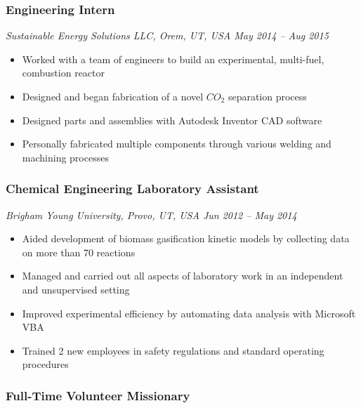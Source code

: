 \hypertarget{engineering-intern}{%
\subsubsection{Engineering Intern}\label{engineering-intern}}

\emph{Sustainable Energy Solutions LLC, Orem, UT, USA \textbar{} May
2014 -- Aug 2015}

\begin{itemize}
\tightlist
\item
  Worked with a team of engineers to build an experimental, multi-fuel,
  combustion reactor
\item
  Designed and began fabrication of a novel \(CO_2\)\hspace{0pt}
  separation process
\item
  Designed parts and assemblies with Autodesk Inventor CAD software
\item
  Personally fabricated multiple components through various welding and
  machining processes
\end{itemize}

\hypertarget{chemical-engineering-laboratory-assistant}{%
\subsubsection{Chemical Engineering Laboratory
Assistant}\label{chemical-engineering-laboratory-assistant}}

\emph{Brigham Young University, Provo, UT, USA \textbar{} Jun 2012 --
May 2014}

\begin{itemize}
\tightlist
\item
  Aided development of biomass gasification kinetic models by collecting
  data on more than 70 reactions
\item
  Managed and carried out all aspects of laboratory work in an
  independent and unsupervised setting
\item
  Improved experimental efficiency by automating data analysis with
  Microsoft VBA
\item
  Trained 2 new employees in safety regulations and standard operating
  procedures
\end{itemize}

\hypertarget{full-time-volunteer-missionary}{%
\subsubsection{Full-Time Volunteer
Missionary}\label{full-time-volunteer-missionary}}

